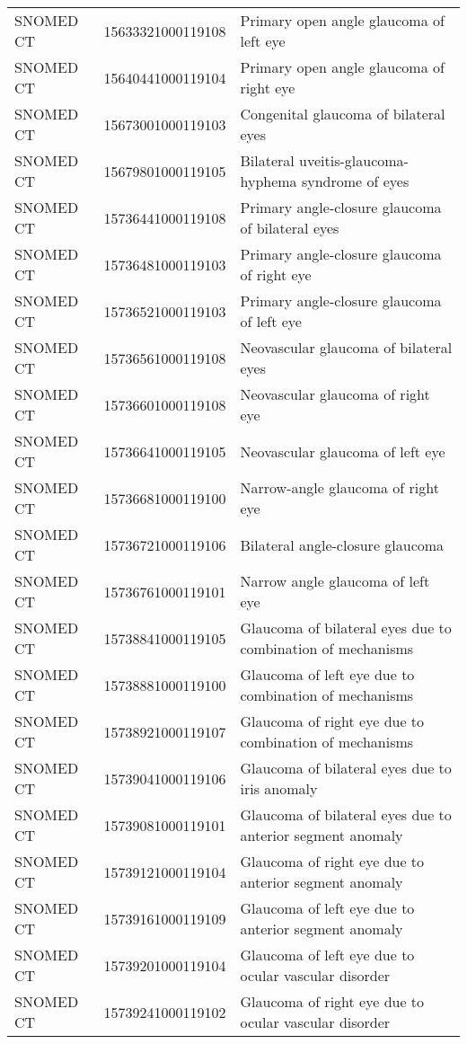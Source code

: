 \begin{longtable}{p{}p{}p{}}
  SNOMED CT & 15633321000119108 & Primary open angle glaucoma of left eye \\ 
  SNOMED CT & 15640441000119104 & Primary open angle glaucoma of right eye \\ 
  SNOMED CT & 15673001000119103 & Congenital glaucoma of bilateral eyes \\ 
  SNOMED CT & 15679801000119105 & Bilateral uveitis-glaucoma-hyphema syndrome of eyes \\ 
  SNOMED CT & 15736441000119108 & Primary angle-closure glaucoma of bilateral eyes \\ 
  SNOMED CT & 15736481000119103 & Primary angle-closure glaucoma of right eye \\ 
  SNOMED CT & 15736521000119103 & Primary angle-closure glaucoma of left eye \\ 
  SNOMED CT & 15736561000119108 & Neovascular glaucoma of bilateral eyes \\ 
  SNOMED CT & 15736601000119108 & Neovascular glaucoma of right eye \\ 
  SNOMED CT & 15736641000119105 & Neovascular glaucoma of left eye \\ 
  SNOMED CT & 15736681000119100 & Narrow-angle glaucoma of right eye \\ 
  SNOMED CT & 15736721000119106 & Bilateral angle-closure glaucoma \\ 
  SNOMED CT & 15736761000119101 & Narrow angle glaucoma of left eye \\ 
  SNOMED CT & 15738841000119105 & Glaucoma of bilateral eyes due to combination of mechanisms \\ 
  SNOMED CT & 15738881000119100 & Glaucoma of left eye due to combination of mechanisms \\ 
  SNOMED CT & 15738921000119107 & Glaucoma of right eye due to combination of mechanisms \\ 
  SNOMED CT & 15739041000119106 & Glaucoma of bilateral eyes due to iris anomaly \\ 
  SNOMED CT & 15739081000119101 & Glaucoma of bilateral eyes due to anterior segment anomaly \\ 
  SNOMED CT & 15739121000119104 & Glaucoma of right eye due to anterior segment anomaly \\ 
  SNOMED CT & 15739161000119109 & Glaucoma of left eye due to anterior segment anomaly \\ 
  SNOMED CT & 15739201000119104 & Glaucoma of left eye due to ocular vascular disorder \\ 
  SNOMED CT & 15739241000119102 & Glaucoma of right eye due to ocular vascular disorder \\ 

\end{longtable}
